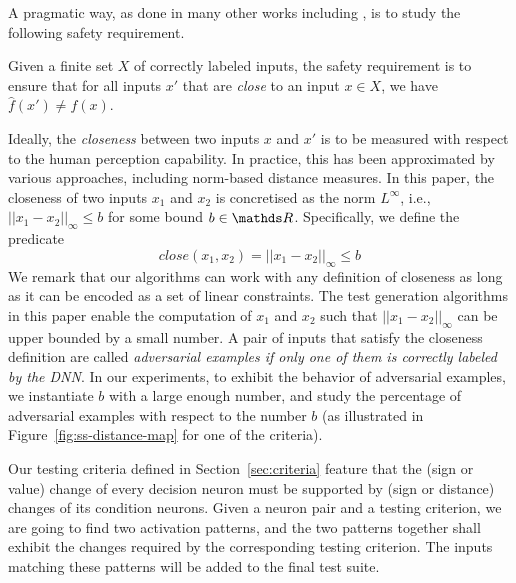 \documentclass[runningheads,a4paper]{llncs}
\newcommand{\distance}[2]{ ||#1||_{#2}}
\begin{document}
A pragmatic way, as done in many other works including \cite{SZSBEGF2014,HKWW2017}, is to study the following safety requirement. 

\begin{definition} \label{def:requirement}
  Given a finite set $X$ of correctly labeled inputs, the safety  requirement is to ensure that for all  inputs $x'$ that are \emph{close} to an input $x\in X$, we have $\hat{f}(x') \neq f(x)$. 
\end{definition}%

Ideally, the \emph{closeness} between two inputs $x$ and $x'$ is to be measured with respect to the human perception capability. In practice, this has been approximated by various approaches, including norm-based distance measures.  In this paper, the closeness of two inputs $x_1$ and $x_2$  is concretised as the norm $L^\infty$, i.e., $\distance{x_1-x_2}{\infty} \leq b$ for some bound $b \in \real$. Specifically, we define the predicate
\begin{equation}
close(x_1,x_2) = \distance{x_1-x_2}{\infty} \leq b
\end{equation}
We remark that our algorithms can work with any definition of closeness as long as it can be encoded as a set of linear constraints. The test generation algorithms in this paper enable the computation of $x_1$ and $x_2$ such that $\distance{x_1-x_2}{\infty}$ 
can be upper bounded by a small number.
A pair of inputs that satisfy the closeness definition are called \emph{adversarial examples if only one of them is correctly labeled by the DNN}.
In our experiments, to exhibit the behavior of adversarial examples, 
we instantiate $b$ with a large enough number, and study the percentage of adversarial examples with respect to the number $b$ (as illustrated in Figure~\ref{fig:ss-distance-map} for one of the criteria). 

Our testing criteria defined in Section~\ref{sec:criteria} feature that the
(sign or value) change of every decision neuron must be supported by (sign
or distance) changes of its condition neurons.  Given a neuron pair
and a testing criterion, we are going to find two activation patterns, and
the two patterns together shall exhibit the changes required by the
corresponding testing criterion.  The inputs matching these patterns
will be added to the final test suite.
\end{document}
